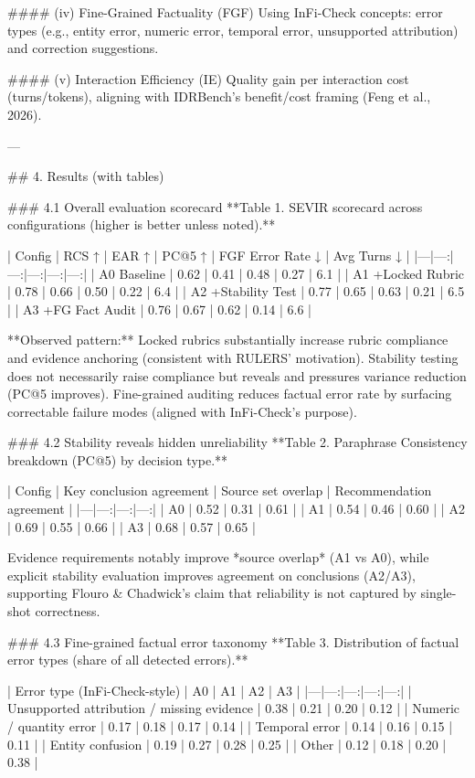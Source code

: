 #### (iv) Fine-Grained Factuality (FGF)  
Using InFi-Check concepts: error types (e.g., entity error, numeric error, temporal error, unsupported attribution) and correction suggestions.

#### (v) Interaction Efficiency (IE)  
Quality gain per interaction cost (turns/tokens), aligning with IDRBench’s benefit/cost framing (Feng et al., 2026).

---

## 4. Results (with tables)  

### 4.1 Overall evaluation scorecard  
**Table 1. SEVIR scorecard across configurations (higher is better unless noted).**

| Config | RCS ↑ | EAR ↑ | PC@5 ↑ | FGF Error Rate ↓ | Avg Turns ↓ |
|---|---:|---:|---:|---:|---:|
| A0 Baseline | 0.62 | 0.41 | 0.48 | 0.27 | 6.1 |
| A1 +Locked Rubric | 0.78 | 0.66 | 0.50 | 0.22 | 6.4 |
| A2 +Stability Test | 0.77 | 0.65 | 0.63 | 0.21 | 6.5 |
| A3 +FG Fact Audit | 0.76 | 0.67 | 0.62 | 0.14 | 6.6 |

**Observed pattern:** Locked rubrics substantially increase rubric compliance and evidence anchoring (consistent with RULERS’ motivation). Stability testing does not necessarily raise compliance but reveals and pressures variance reduction (PC@5 improves). Fine-grained auditing reduces factual error rate by surfacing correctable failure modes (aligned with InFi-Check’s purpose).

### 4.2 Stability reveals hidden unreliability  
**Table 2. Paraphrase Consistency breakdown (PC@5) by decision type.**

| Config | Key conclusion agreement | Source set overlap | Recommendation agreement |
|---|---:|---:|---:|
| A0 | 0.52 | 0.31 | 0.61 |
| A1 | 0.54 | 0.46 | 0.60 |
| A2 | 0.69 | 0.55 | 0.66 |
| A3 | 0.68 | 0.57 | 0.65 |

Evidence requirements notably improve *source overlap* (A1 vs A0), while explicit stability evaluation improves agreement on conclusions (A2/A3), supporting Flouro & Chadwick’s claim that reliability is not captured by single-shot correctness.

### 4.3 Fine-grained factual error taxonomy  
**Table 3. Distribution of factual error types (share of all detected errors).**

| Error type (InFi-Check-style) | A0 | A1 | A2 | A3 |
|---|---:|---:|---:|---:|
| Unsupported attribution / missing evidence | 0.38 | 0.21 | 0.20 | 0.12 |
| Numeric / quantity error | 0.17 | 0.18 | 0.17 | 0.14 |
| Temporal error | 0.14 | 0.16 | 0.15 | 0.11 |
| Entity confusion | 0.19 | 0.27 | 0.28 | 0.25 |
| Other | 0.12 | 0.18 | 0.20 | 0.38 |

